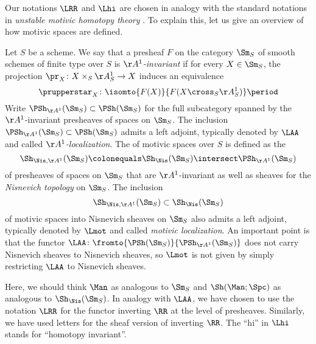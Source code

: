 \begin{remark}[{(notations)}]
	Our notations $ \LRR $ and $ \Lhi $ are chosen in analogy with the standard notations in \textit{unstable motivic homotopy theory} \cites[\S2.2]{MotivicNorms:BachmannHoyois}{MR2242284}{MR2275634}{MR2934577}{MR1648048}{MR1813224}.
	To explain this, let us give an overview of how motivic spaces are defined.

	Let $ S $ be a scheme.
	We say that a presheaf $ F $ on the category $ \Sm_S $ of smooth schemes of finite type over $ S $ is \emph{$ \AA^1 $-invariant} if for every $ X \in \Sm_S $, the projection $ \pr_X \colon X \times_S \AA_S^1 \to X $ induces an equivalence
    \begin{equation*}
       \prupperstar_X \colon \isomto{F(X)}{F(X \cross_S \AA_S^1)} \period
    \end{equation*}
    Write $ \PSh_{\AA^1}(\Sm_S) \subset \PSh(\Sm_S) $ for the full subcategory spanned by the $ \AA^1 $-invariant presheaves of spaces on $ \Sm_S $.
    The inclusion $ \PSh_{\AA^1}(\Sm_S) \subset \PSh(\Sm_S) $ admits a left adjoint, typically denoted by $ \LAA $ and called \emph{$ \AA^1 $-localization}.
    The \category of motivic spaces over $ S $ is defined as the \category
    \begin{equation*}
    	\Sh_{\Nis,\AA^1}(\Sm_S) \colonequals \Sh_{\Nis}(\Sm_S) \intersect \PSh_{\AA^1}(\Sm_S)
    \end{equation*}
    of presheaves of spaces on $ \Sm_S $ that are $ \AA^1 $-invariant as well as sheaves for the \emph{Nisnevich topology} on $ \Sm_S $.
    The inclusion
    \begin{equation*}
    	\Sh_{\Nis,\AA^1}(\Sm_S) \subset \Sh_{\Nis}(\Sm_S) 
    \end{equation*}
    of motivic spaces into Nisnevich sheaves on $ \Sm_S $ also admits a left adjoint, typically denoted by $ \Lmot $ and called \emph{motivic localization}.
    An important point is that the functor $ \LAA \colon \fromto{\PSh(\Sm_S)}{\PSh_{\AA^1}(\Sm_S)} $ does not carry Nisnevich sheaves to Nisnevich sheaves, so $ \Lmot $ is not given by simply restricting $ \LAA $ to Nisnevich sheaves.

    Here, we should think $ \Man $ as analogous to $ \Sm_S $ and $ \Sh(\Man;\Spc) $ as analogous to $ \Sh_{\Nis}(\Sm_S) $.
    In analogy with $ \LAA $, we have chosen to use the notation $ \LRR $ for the functor inverting $ \RR $ at the level of presheaves.
    Similarly, we have used letters for the sheaf version of inverting $ \RR $.
    The ``hi'' in $ \Lhi $ stands for ``homotopy invariant''.
\end{remark}

